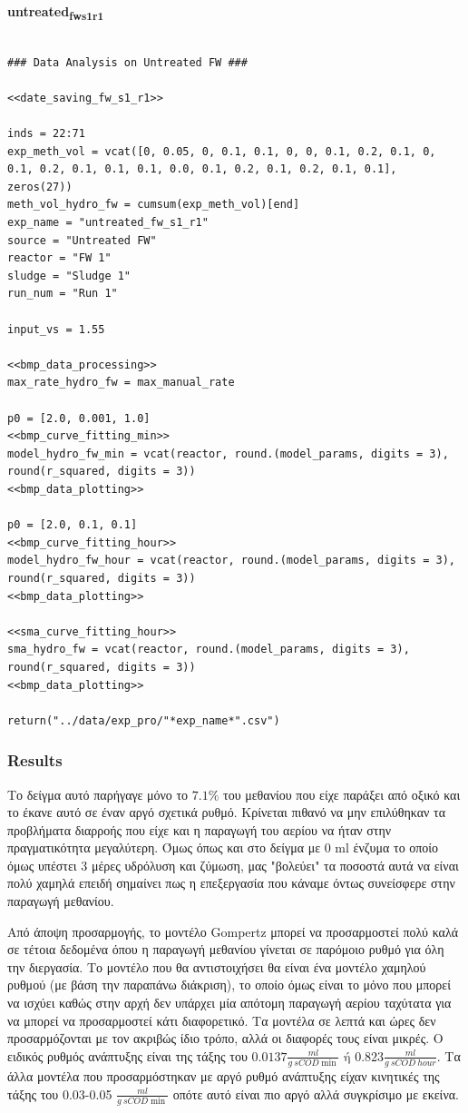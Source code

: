 \documentclass[11pt]{article}
\begin{document}
\textbf{untreated\textsubscript{fw}\textsubscript{s1}\textsubscript{r1}}
\begin{verbatim}

### Data Analysis on Untreated FW ###

<<date_saving_fw_s1_r1>>

inds = 22:71
exp_meth_vol = vcat([0, 0.05, 0, 0.1, 0.1, 0, 0, 0.1, 0.2, 0.1, 0, 0.1, 0.2, 0.1, 0.1, 0.1, 0.0, 0.1, 0.2, 0.1, 0.2, 0.1, 0.1], zeros(27))
meth_vol_hydro_fw = cumsum(exp_meth_vol)[end]
exp_name = "untreated_fw_s1_r1"
source = "Untreated FW"
reactor = "FW 1"
sludge = "Sludge 1"
run_num = "Run 1"

input_vs = 1.55

<<bmp_data_processing>>
max_rate_hydro_fw = max_manual_rate

p0 = [2.0, 0.001, 1.0]
<<bmp_curve_fitting_min>>
model_hydro_fw_min = vcat(reactor, round.(model_params, digits = 3), round(r_squared, digits = 3))
<<bmp_data_plotting>>

p0 = [2.0, 0.1, 0.1]
<<bmp_curve_fitting_hour>>
model_hydro_fw_hour = vcat(reactor, round.(model_params, digits = 3), round(r_squared, digits = 3))
<<bmp_data_plotting>>

<<sma_curve_fitting_hour>>
sma_hydro_fw = vcat(reactor, round.(model_params, digits = 3), round(r_squared, digits = 3))
<<bmp_data_plotting>>

return("../data/exp_pro/"*exp_name*".csv")
\end{verbatim}

\subsubsection{Results}
\label{sec:org3138415}
Το δείγμα αυτό παρήγαγε μόνο το \(7.1 \%\) του μεθανίου που είχε παράξει από οξικό και το έκανε αυτό σε έναν αργό σχετικά ρυθμό. Κρίνεται πιθανό να μην επιλύθηκαν τα προβλήματα διαρροής που είχε και η παραγωγή του αερίου να ήταν στην πραγματικότητα μεγαλύτερη. Όμως όπως και στο δείγμα με 0 ml ένζυμα το οποίο όμως υπέστει 3 μέρες υδρόλυση και ζύμωση, μας "βολεύει" τα ποσοστά αυτά να είναι πολύ χαμηλά επειδή σημαίνει πως η επεξεργασία που κάναμε όντως συνείσφερε στην παραγωγή μεθανίου.

Από άποψη προσαρμογής, το μοντέλο Gompertz μπορεί να προσαρμοστεί πολύ καλά σε τέτοια δεδομένα όπου η παραγωγή μεθανίου γίνεται σε παρόμοιο ρυθμό για όλη την διεργασία. Το μοντέλο που θα αντιστοιχήσει θα είναι ένα μοντέλο χαμηλού ρυθμού (με βάση την παραπάνω διάκριση), το οποίο όμως είναι το μόνο που μπορεί να ισχύει καθώς στην αρχή δεν υπάρχει μία απότομη παραγωγή αερίου ταχύτατα για να μπορεί να προσαρμοστεί κάτι διαφορετικό. Τα μοντέλα σε λεπτά και ώρες δεν προσαρμόζονται με τον ακριβώς ίδιο τρόπο, αλλά οι διαφορές τους είναι μικρές. Ο ειδικός ρυθμός ανάπτυξης είναι της τάξης του \(0.0137 \frac{ml}{g ~ sCOD \min} \text{ ή } 0.823 \frac{ml}{g ~ sCOD ~ hour}\). Τα άλλα μοντέλα που προσαρμόστηκαν με αργό ρυθμό ανάπτυξης είχαν κινητικές της τάξης του 0.03-0.05 \(\frac{ml}{g ~ sCOD \min }\) οπότε αυτό είναι πιο αργό αλλά συγκρίσιμο με εκείνα.
\end{document}
